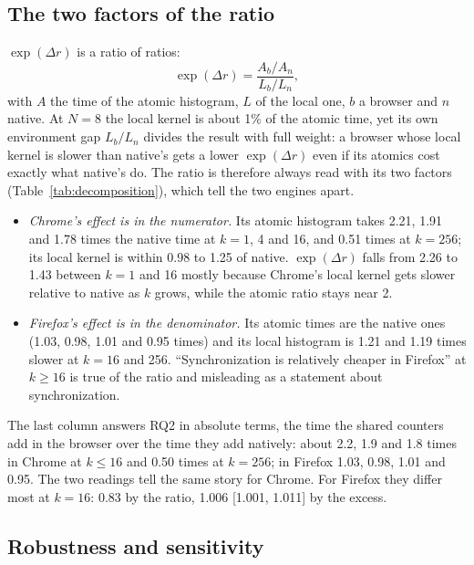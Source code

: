

\subsection{The two factors of the ratio}
\label{sec:decomposition}

$\exp(\Delta r)$ is a ratio of ratios:
\[
\exp(\Delta r) = \frac{A_b/A_n}{L_b/L_n},
\]
with $A$ the time of the atomic histogram, $L$ of the local one, $b$ a
browser and $n$ native. At $N=8$ the local kernel is about 1\% of the
atomic time, yet its own environment gap $L_b/L_n$ divides the result with
full weight: a browser whose local kernel is slower than native's gets a
lower $\exp(\Delta r)$ even if its atomics cost exactly what native's do.
The ratio is therefore always read with its two factors
(Table~\ref{tab:decomposition}), which tell the two engines apart.



\begin{itemize}[leftmargin=1.5em]
\item \emph{Chrome's effect is in the numerator.} Its atomic histogram
takes 2.21, 1.91 and 1.78 times the native time at $k=1$, 4 and 16, and
0.51 times at $k=256$; its local kernel is within 0.98 to 1.25 of native.
$\exp(\Delta r)$ falls from 2.26 to 1.43 between $k=1$ and 16 mostly
because Chrome's local kernel gets slower relative to native as $k$ grows,
while the atomic ratio stays near 2.
\item \emph{Firefox's effect is in the denominator.} Its atomic times are
the native ones (1.03, 0.98, 1.01 and 0.95 times) and its local histogram
is 1.21 and 1.19 times slower at $k=16$ and 256. ``Synchronization is
relatively cheaper in Firefox'' at $k \geq 16$ is true of the ratio and
misleading as a statement about synchronization.
\end{itemize}
The last column answers RQ2 in absolute terms, the time the shared counters
add in the browser over the time they add natively: about 2.2, 1.9 and 1.8
times in Chrome at $k \leq 16$ and 0.50 times at $k=256$; in Firefox 1.03,
0.98, 1.01 and 0.95. The two readings tell the same story for Chrome. For
Firefox they differ most at $k=16$: 0.83 by the ratio, 1.006 [1.001, 1.011]
by the excess.

\subsection{Robustness and sensitivity}

